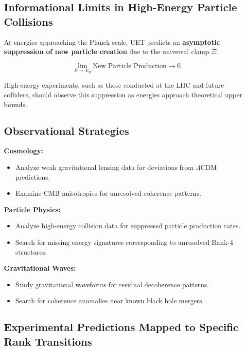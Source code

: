\documentclass[12pt,a4paper]{article}
\begin{document}
\subsection{Informational Limits in High-Energy Particle Collisions}

At energies approaching the Planck scale, UET predicts an \textbf{asymptotic suppression of new particle creation} due to the universal clamp \(\Xi\):

\[
\lim_{E \to E_P} \text{New Particle Production} \to 0
\]

High-energy experiments, such as those conducted at the LHC and future colliders, should observe this suppression as energies approach theoretical upper bounds.

\subsection{Observational Strategies}

\textbf{Cosmology:}
\begin{itemize}
    \item Analyze weak gravitational lensing data for deviations from \(\Lambda\)CDM predictions.
    \item Examine CMB anisotropies for unresolved coherence patterns.
\end{itemize}

\textbf{Particle Physics:}
\begin{itemize}
    \item Analyze high-energy collision data for suppressed particle production rates.
    \item Search for missing energy signatures corresponding to unresolved Rank-4 structures.
\end{itemize}

\textbf{Gravitational Waves:}
\begin{itemize}
    \item Study gravitational waveforms for residual decoherence patterns.
    \item Search for coherence anomalies near known black hole mergers.
\end{itemize}

\subsection{Experimental Predictions Mapped to Specific Rank Transitions}
\end{document}
